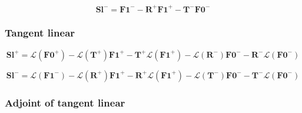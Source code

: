\begin{equation}
\mathbf{Sl}^{-} = \mathbf{F1}^{-} - \mathbf{R}^{+}\mathbf{F1}^{+} - \mathbf{T}^{-}\mathbf{F0}^{-}
\label{eq:thermal_source_global_thermal_source-forward-sl_m}
\end{equation}


%
\subsubsection{Tangent linear}
\label{sec:thermal_source_global_thermal_source-tangent_linear}

\begin{equation}
\mathbf{Sl}^{+} = \mathcal{L}(\mathbf{F0}^{+}) - \mathcal{L}(\mathbf{T}^{+})\mathbf{F1}^{+} - \mathbf{T}^{+}\mathcal{L}(\mathbf{F1}^{+}) - \mathcal{L}(\mathbf{R}^{-})\mathbf{F0}^{-} - \mathbf{R}^{-}\mathcal{L}(\mathbf{F0}^{-})
\label{eq:thermal_source_global_thermal_source-tangent_linear-sl_p_l}
\end{equation}

\begin{equation}
\mathbf{Sl}^{-} = \mathcal{L}(\mathbf{F1}^{-}) - \mathcal{L}(\mathbf{R}^{+})\mathbf{F1}^{+} - \mathbf{R}^{+}\mathcal{L}(\mathbf{F1}^{+}) - \mathcal{L}(\mathbf{T}^{-})\mathbf{F0}^{-} - \mathbf{T}^{-}\mathcal{L}(\mathbf{F0}^{-})
\label{eq:thermal_source_global_thermal_source-tangent_linear-sl_m_l}
\end{equation}


%
\subsubsection{Adjoint of tangent linear}
\label{sec:thermal_source_global_thermal_source-adjoint_of_tangent_linear}
